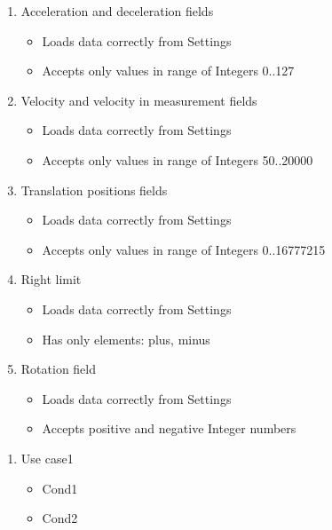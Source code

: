 \begin{enumerate}
\item Acceleration and deceleration fields
\begin{itemize}
\item Loads data correctly from Settings
\item Accepts only values in range of Integers 0..127
\end{itemize}

\item Velocity and velocity in measurement fields
\begin{itemize}
\item Loads data correctly from Settings
\item Accepts only values in range of Integers 50..20000
\end{itemize}

\item Translation positions fields
\begin{itemize}
\item Loads data correctly from Settings
\item Accepts only values in range of Integers 0..16777215
\end{itemize}

\item Right limit
\begin{itemize}
\item Loads data correctly from Settings
\item Has only elements: plus, minus
\end{itemize}

\item Rotation field
\begin{itemize}
\item Loads data correctly from Settings
\item Accepts positive and negative Integer numbers
\end{itemize}

\end{enumerate}

\label{cases:className}

\begin{enumerate}

\item Use case1
\begin{itemize}
\item Cond1
\item Cond2
\end{itemize}

\end{enumerate}